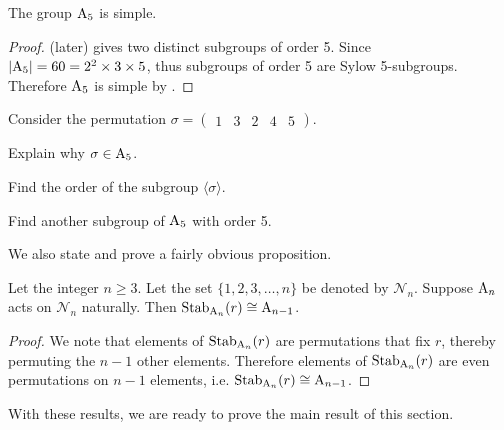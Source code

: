 \begin{corollary}\label{corollary-A5-is-simple}
    The group $\mathrm{A}_{5}$ is simple.
\end{corollary}
\begin{proof}
     (later) gives two distinct subgroups of order 5. Since $|\mathrm{A}_{5}| = 60 = 2^2 \times 3 \times 5$, thus subgroups of order 5 are Sylow 5-subgroups. Therefore $\mathrm{A}_{5}$ is simple by .
\end{proof}
\begin{exercise}\label{exercise-A5-has-two-distinct-subgroups-of-order-5}
    Consider the permutation $\sigma = \begin{pmatrix}1&3&2&4&5\end{pmatrix}$.
    \begin{partquestions}{\roman*}
        \item Explain why $\sigma \in \mathrm{A}_{5}$.
        \item Find the order of the subgroup $\langle \sigma \rangle$.
        \item Find another subgroup of $\mathrm{A}_{5}$ with order 5.
    \end{partquestions}
\end{exercise}

We also state and prove a fairly obvious proposition.

\begin{proposition}\label{prop-An-stabilizer-of-i-is-isomorphic-to-A(n-1)}
    Let the integer $n \geq 3$. Let the set $\{1, 2, 3, \dots, n\}$ be denoted by $\mathcal{N}_n$. Suppose $\mathrm{A}_{n}$ acts on $\mathcal{N}_n$ naturally. Then $\mathrm{Stab}_{\mathrm{A}_{n}}(r) \cong \mathrm{A}_{n-1}$.
\end{proposition}
\begin{proof}
    We note that elements of $\mathrm{Stab}_{\mathrm{A}_{n}}(r)$ are permutations that fix $r$, thereby permuting the $n - 1$ other elements. Therefore elements of $\mathrm{Stab}_{\mathrm{A}_{n}}(r)$ are even permutations on $n - 1$ elements, i.e. $\mathrm{Stab}_{\mathrm{A}_{n}}(r) \cong \mathrm{A}_{n-1}$.
\end{proof}

With these results, we are ready to prove the main result of this section.

